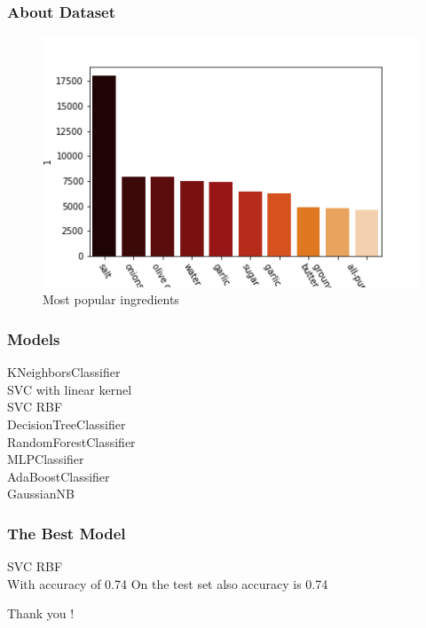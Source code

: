 \documentclass{beamer}
\begin{document}
\begin{frame}
\frametitle{About Dataset}

\begin{figure}

	\centering
	\includegraphics[width=1.1\linewidth, height=0.7\textheight, keepaspectratio]{../pop_ingr.png}
	\caption{Most popular ingredients}
	\label{fig:pop_ingr}

\end{figure}

\end{frame}

\begin{frame}
\frametitle{Models}


KNeighborsClassifier \\
SVC with linear kernel\\
SVC RBF \\
DecisionTreeClassifier \\
RandomForestClassifier\\
MLPClassifier \\
AdaBoostClassifier \\
GaussianNB

\end{frame}

\begin{frame}
\frametitle{The Best Model}

SVC RBF \\
With accuracy of 0.74
On the test set also accuracy is 0.74

\end{frame}

\begin{frame}

\centering
Thank you !

\end{frame}
\end{document}
